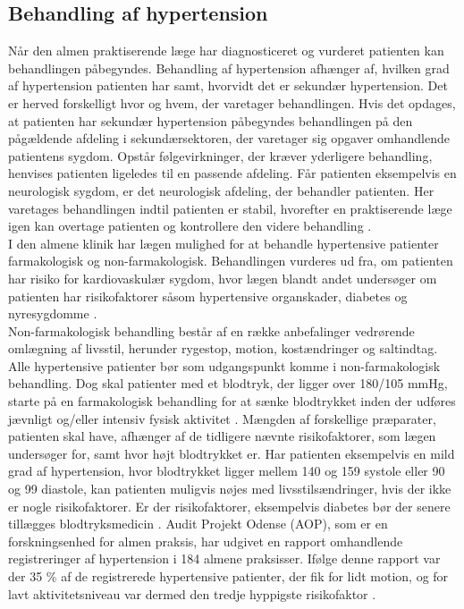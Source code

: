 \subsection{Behandling af hypertension}
Når den almen praktiserende læge har diagnosticeret og vurderet patienten kan behandlingen påbegyndes. Behandling af hypertension afhænger af, hvilken grad af hypertension patienten har samt, hvorvidt det er sekundær hypertension. Det er herved forskelligt hvor og hvem, der varetager behandlingen. Hvis det opdages, at patienten har sekundær hypertension påbegyndes behandlingen på den pågældende afdeling i sekundærsektoren, der varetager sig opgaver omhandlende patientens sygdom. Opstår følgevirkninger, der kræver yderligere behandling, henvises patienten ligeledes til en passende afdeling. Får patienten eksempelvis en neurologisk sygdom, er det neurologisk afdeling, der behandler patienten. Her varetages behandlingen indtil patienten er stabil, hvorefter en praktiserende læge igen kan overtage patienten og kontrollere den videre behandling \citep{sundhedssyrelsen2010}.
\\
I den almene klinik har lægen mulighed for at behandle hypertensive patienter farmakologisk og non-farmakologisk. Behandlingen vurderes ud fra, om patienten har risiko for kardiovaskulær sygdom, hvor lægen blandt andet undersøger om patienten har risikofaktorer såsom hypertensive organskader, diabetes og nyresygdomme \citep{promedicin2016}. \\
Non-farmakologisk behandling består af en række anbefalinger vedrørende omlægning af livsstil, herunder rygestop, motion, kostændringer og saltindtag. Alle hypertensive patienter bør som udgangspunkt komme i non-farmakologisk behandling. Dog skal patienter med et blodtryk, der ligger over 180/105 mmHg, starte på en farmakologisk behandling for at sænke blodtrykket inden der udføres jævnligt og/eller intensiv fysisk aktivitet \citep{pedersen2016}.
Mængden af forskellige præparater, patienten skal have, afhænger af de tidligere nævnte risikofaktorer, som lægen undersøger for, samt hvor højt blodtrykket er. Har patienten eksempelvis en mild grad af hypertension, hvor blodtrykket ligger mellem 140 og 159 systole eller 90 og 99 diastole, kan patienten muligvis nøjes med livsstilsændringer, hvis der ikke er nogle risikofaktorer. Er der risikofaktorer, eksempelvis diabetes bør der senere tillægges blodtryksmedicin \citep{bech2015}. Audit Projekt Odense (AOP), som er en forskningsenhed for almen praksis, har udgivet en rapport omhandlende registreringer af hypertension i 184 almene praksisser. Ifølge denne rapport var der 35 \% af de registrerede hypertensive patienter, der fik for lidt motion, og for lavt aktivitetsniveau var dermed den tredje hyppigste risikofaktor \citep{munck2007}. \\
